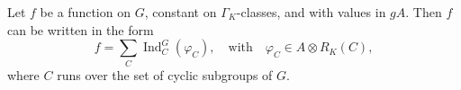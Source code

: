 Let $f$ be a function on $G$, constant on $\Gamma_K$-classes, and with values in $gA$. Then $f$ can be written in the form
$$f = \sum_C \operatorname{Ind}_C^G(\varphi_C), \quad \text{with} \quad \varphi_C \in A \otimes R_K(C),$$
where $C$ runs over the set of cyclic subgroups of $G$.
